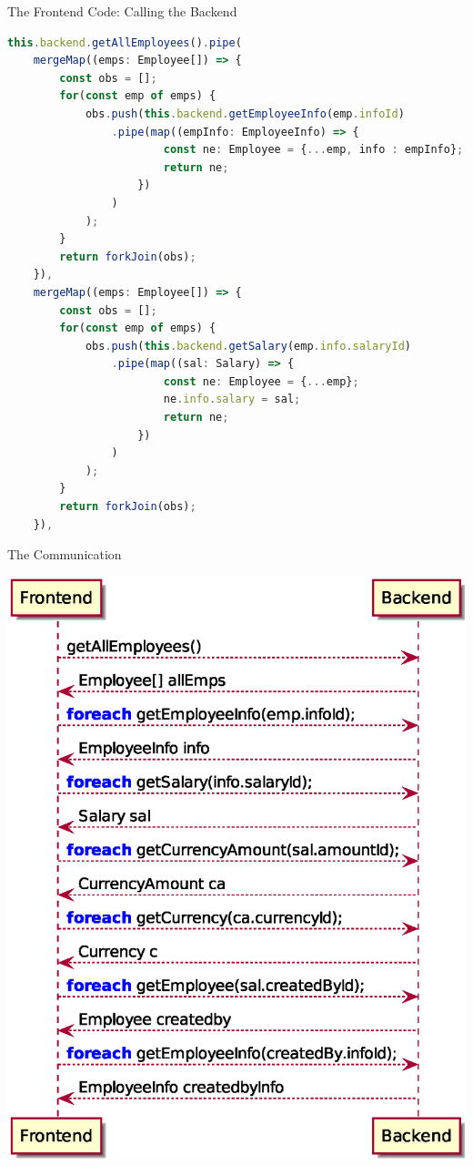 \documentclass[aspectratio=169,notes]{beamer}
\begin{document}
	\begin{frame}[fragile]{The Frontend Code: Calling the Backend}
\begin{lstlisting}[language=TypeScript,basicstyle=\footnotesize\ttfamily,tabsize=2]
this.backend.getAllEmployees().pipe(
	mergeMap((emps: Employee[]) => {
		const obs = [];
		for(const emp of emps) {
			obs.push(this.backend.getEmployeeInfo(emp.infoId)
				.pipe(map((empInfo: EmployeeInfo) => {
						const ne: Employee = {...emp, info : empInfo};
						return ne;
					})
				)
			);
		}
		return forkJoin(obs);
	}),
	mergeMap((emps: Employee[]) => {
		const obs = [];
		for(const emp of emps) {
			obs.push(this.backend.getSalary(emp.info.salaryId)
				.pipe(map((sal: Salary) => {
						const ne: Employee = {...emp};
						ne.info.salary = sal;
						return ne;
					})
				)
			);
		}
		return forkJoin(obs);
	}),
\end{lstlisting}
\end{frame}

	\begin{frame}[fragile]{The Communication}
		\begin{center}
			\includegraphics[height=0.9\textheight]{restbackend.eps}
		\end{center}
	\end{frame}
	
\end{document}
